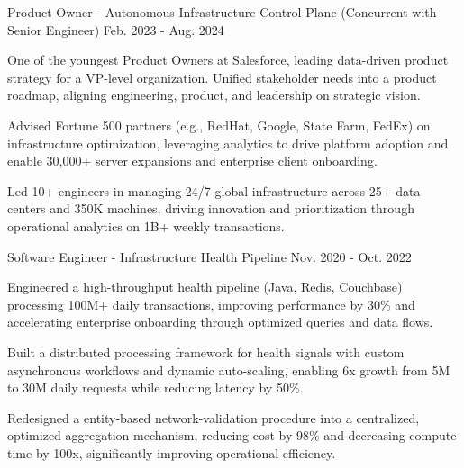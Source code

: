 \begin{cventries}
  \cventry
    {Product Owner - Autonomous Infrastructure Control Plane \linebreak(Concurrent with Senior Engineer)}
    { }
    { }
    {Feb. 2023 - Aug. 2024}
    {
      \begin{cvitems}
        \item {One of the youngest Product Owners at Salesforce, leading data-driven product strategy for a VP-level organization. Unified stakeholder needs into a product roadmap, aligning engineering, product, and leadership on strategic vision.}
        \item {Advised Fortune 500 partners (e.g., RedHat, Google, State Farm, FedEx) on infrastructure optimization, leveraging analytics to drive platform adoption and enable 30,000+ server expansions and enterprise client onboarding.}
        \item {Led 10+ engineers in managing 24/7 global infrastructure across 25+ data centers and 350K machines, driving innovation and prioritization through operational analytics on 1B+ weekly transactions.}
      \end{cvitems}
    }

  \cventry
  {Software Engineer - Infrastructure Health Pipeline}
  {}
  {}
  {Nov. 2020 - Oct. 2022}
  {
    \begin{cvitems}
      \item {Engineered a high-throughput health pipeline (Java, Redis, Couchbase) processing 100M+ daily transactions, improving performance by 30\% and accelerating enterprise onboarding through optimized queries and data flows.}
      \item {Built a distributed processing framework for health signals with custom asynchronous workflows and dynamic auto-scaling, enabling 6x growth from 5M to 30M daily requests while reducing latency by 50\%.}
      \item {Redesigned a entity-based network-validation procedure into a centralized, optimized aggregation mechanism, reducing cost by 98\% and decreasing compute time by 100x, significantly improving operational efficiency.}
    \end{cvitems}
  }


\end{cventries}
